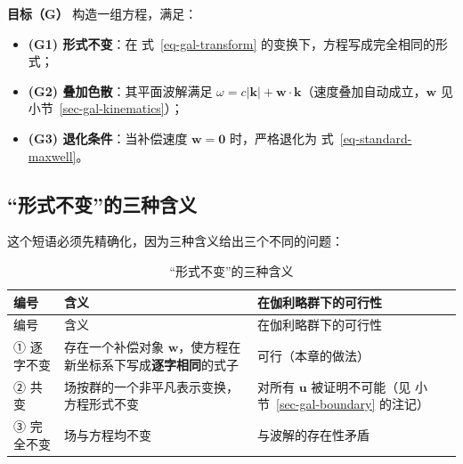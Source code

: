 \documentclass[
  chinese,
  a4paper,
  UTF8,
  12pt,
  oneside,
  openany]{ctexbook}
\providecommand{\tightlist}{%
  \setlength{\itemsep}{0pt}\setlength{\parskip}{0pt}}
\theoremstyle{plain}
\theoremstyle{plain}
\theoremstyle{plain}
\theoremstyle{definition}
\theoremstyle{plain}
\theoremstyle{plain}
\theoremstyle{remark}
\begin{document}
\textbf{目标（G）} 构造一组方程，满足：

\begin{itemize}
\tightlist
\item
  \textbf{(G1) 形式不变}：在 式~\ref{eq-gal-transform}
  的变换下，方程写成完全相同的形式；
\item
  \textbf{(G2) 叠加色散}：其平面波解满足
  \(\omega = c|\mathbf{k}| + \mathbf{w}\cdot\mathbf{k}\)（速度叠加自动成立，\(\mathbf{w}\)
  见 小节~\ref{sec-gal-kinematics}）；
\item
  \textbf{(G3) 退化条件}：当补偿速度 \(\mathbf{w}=\mathbf{0}\)
  时，严格退化为 式~\ref{eq-standard-maxwell}。
\end{itemize}

\subsection{``形式不变''的三种含义}\label{ux5f62ux5f0fux4e0dux53d8ux7684ux4e09ux79cdux542bux4e49}

这个短语必须先精确化，因为三种含义给出三个不同的问题：

\begin{longtable}[]{@{}
  >{\raggedright\arraybackslash}p{}
  >{\raggedright\arraybackslash}p{}
  >{\raggedright\arraybackslash}p{}@{}}
\caption{``形式不变''的三种含义}\label{tbl-form-invariance}\tabularnewline
\toprule\noalign{}
\begin{minipage}[b]{\linewidth}\raggedright
编号
\end{minipage} & \begin{minipage}[b]{\linewidth}\raggedright
含义
\end{minipage} & \begin{minipage}[b]{\linewidth}\raggedright
在伽利略群下的可行性
\end{minipage} \\
\midrule\noalign{}
\endfirsthead
\toprule\noalign{}
\begin{minipage}[b]{\linewidth}\raggedright
编号
\end{minipage} & \begin{minipage}[b]{\linewidth}\raggedright
含义
\end{minipage} & \begin{minipage}[b]{\linewidth}\raggedright
在伽利略群下的可行性
\end{minipage} \\
\midrule\noalign{}
\endhead
\bottomrule\noalign{}
\endlastfoot
① 逐字不变 & 存在一个补偿对象
\(\mathbf{w}\)，使方程在新坐标系下写成\textbf{逐字相同}的式子 &
可行（本章的做法） \\
② 共变 & 场按群的一个非平凡表示变换，方程形式不变 & 对所有
\(\mathbf{u}\) 被证明不可能（见 小节~\ref{sec-gal-boundary} 的注记） \\
③ 完全不变 & 场与方程均不变 & 与波解的存在性矛盾 \\
\end{longtable}
\end{document}
